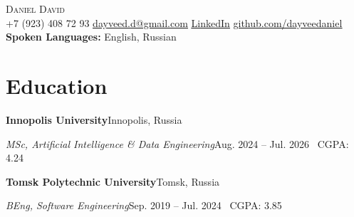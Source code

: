 \documentclass[11pt]{article}
\newcommand{\entry}[2]{\textbf{#1}\hfill #2\par}
\begin{document}
\begin{center}
    {\Huge\scshape Daniel David}\\[3pt]
    \small +7 (923) 408 72 93 \enspace\textbar\enspace
    \href{mailto:dayveed.d@gmail.com}{\underline{dayveed.d@gmail.com}} \enspace\textbar\enspace
    \href{https://www.linkedin.com/in/dayveedaniel}{\underline{LinkedIn}} \enspace\textbar\enspace
    \href{https://github.com/dayveedaniel}{\underline{github.com/dayveedaniel}}\\[3pt]
    \textbf{Spoken Languages:} English, Russian
\end{center}
\vspace{-9pt}
\fontsize{10}{11.5}\selectfont

\section{Education}
\entry{Innopolis University}{Innopolis, Russia}
\textit{MSc, Artificial Intelligence \& Data Engineering}\hfill Aug. 2024 -- Jul. 2026 \textbar\ CGPA: 4.24\par
\vspace{3pt}
\entry{Tomsk Polytechnic University}{Tomsk, Russia}
\textit{BEng, Software Engineering}\hfill Sep. 2019 -- Jul. 2024 \textbar\ CGPA: 3.85\par
\end{document}
